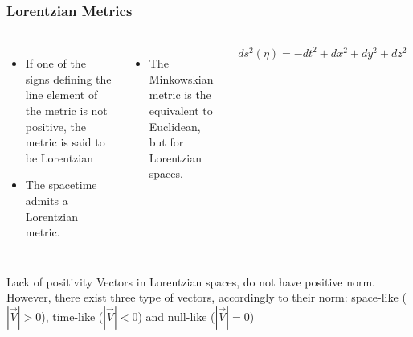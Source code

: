 \begin{frame}
  \frametitle{Lorentzian Metrics}
  \begin{columns}[t]
    \begin{itemize}
    \item If one of the signs defining the line element of the metric is not positive, the metric is said to be \alert{Lorentzian}
    \item The spacetime admits a Lorentzian metric.
    
    \end{itemize}
    \begin{itemize}
    \item  The \alert{Minkowskian} metric is the equivalent to Euclidean, but for Lorentzian spaces.
    \end{itemize}
    \begin{align*}
      ds^2(\eta) = -dt^2+dx^2+dy^2+dz^2
    \end{align*}
  \end{columns}

  \begin{alertblock}{Lack of positivity}
    Vectors in Lorentzian spaces, do not have positive norm. However, there exist three type of vectors, accordingly to their norm: space-like ($|{\vec{V}}|>0$), time-like ($|{\vec{V}}|<0$) and null-like ($|{\vec{V}}|=0$)
  \end{alertblock}
\end{frame}

